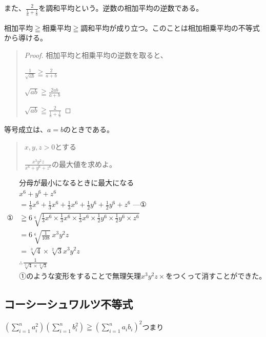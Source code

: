 \documentclass[uplatex,fleqn]{jsbook}
\begin{document}
また、$\displaystyle \frac{2}{\frac{1}{a}+\frac{1}{b}}$を調和平均という。逆数の相加平均の逆数である。

相加平均$\geqq$相乗平均$\geqq$調和平均が成り立つ。このことは相加相乗平均の不等式から導ける。
\begin{quote}
    \begin{proof}
        相加平均と相乗平均の逆数を取ると、

        $\displaystyle \frac{1}{\sqrt{ab}}\geqq\frac{2}{a+b}$

        $\displaystyle \sqrt{ab}\geqq\frac{2ab}{a+b}$

        $\displaystyle \sqrt{ab}\geqq\frac{2}{\frac{1}{a}+\frac{1}{b}}$
    \end{proof}
\end{quote}

等号成立は、$a=b$のときである。

\begin{quote}
    $x,y,z>0$とする

    $\displaystyle \frac{x^3y^2z}{x^6+y^6+z^6}$の最大値を求めよ。
\end{quote}

\begin{align*}
    &\text{分母が最小になるときに最大になる}\\
    &x^6+y^6+z^6\\
    &=\frac{1}{3}x^6+\frac{1}{3}x^6+\frac{1}{3}x^6+\frac{1}{2}y^6+\frac{1}{2}y^6+z^6\text{ ---①}\\
    \text{①}&\geqq6\sqrt[6]{\frac{1}{3}x^6\times\frac{1}{3}x^6\times\frac{1}{3}x^6\times\frac{1}{2}y^6\times\frac{1}{2}y^6\times z^6}\\
    &=6\sqrt[6]{\frac{1}{108}}\ x^3y^2z\\
    &=\sqrt[3]{4}\times\sqrt[2]{3}x^3y^2z\\
    &\therefore \frac{1}{\sqrt[3]{4}\times\sqrt[2]{3}}\\
    &\text{①のような変形をすることで無理矢理}x^3y^2z\times{をつくって消すことができた。}
\end{align*}

\subsection{コーシーシュワルツ不等式}
$\displaystyle \left(\sum_{i=1}^n a^2_i\right)\left(\sum_{i=1}^n b^2_i\right)\geqq\left(\sum_{i=1}^n a_ib_i\right)^2$つまり
\end{document}

